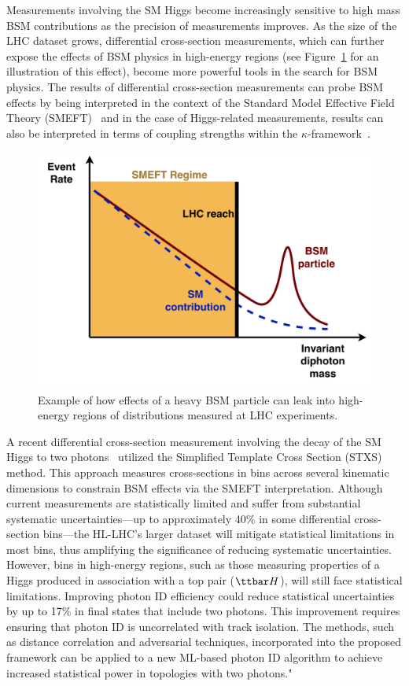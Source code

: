 \documentclass[letter, USenglish, 11pt, subfigure]{article}
\newcommand{\tth}{\ensuremath{\ttbar H}}
\begin{document}
Measurements involving the SM Higgs become increasingly sensitive to high mass BSM contributions as the precision of measurements improves. As the size of the LHC dataset grows, differential cross-section measurements, which can further expose the effects of BSM physics in high-energy regions (see Figure~\ref{fig:SMEFT_highmass} for an illustration of this effect), become more powerful tools in the search for BSM physics.
The results of differential cross-section measurements can probe BSM effects by being interpreted in the context of the Standard Model Effective Field Theory (SMEFT)~\cite{Buchmuller:1985jz,Grzadkowski:2010es,SMEFTsim3} and in the case of Higgs-related measurements, results can also be interpreted in terms of coupling strengths within the $\kappa$-framework~\cite{deFlorian:2016spz}.
\begin{figure}
  \centering
  \includegraphics[width=\linewidth]{figures/SMEFT.pdf}
  \caption{\label{fig:SMEFT_highmass} Example of how effects of a heavy BSM particle can leak into high-energy regions of distributions measured at LHC experiments.}
\end{figure}
A recent differential cross-section measurement involving the decay of the SM Higgs to two photons~\cite{ATLAS_STXS} utilized the Simplified Template Cross Section (STXS) method. This approach measures cross-sections in bins across several kinematic dimensions to constrain BSM effects via the SMEFT interpretation. Although current measurements are statistically limited and suffer from substantial systematic uncertainties—up to approximately 40\% in some differential cross-section bins—the HL-LHC's larger dataset will mitigate statistical limitations in most bins, thus amplifying the significance of reducing systematic uncertainties. However, bins in high-energy regions, such as those measuring properties of a Higgs produced in association with a top pair (\tth), will still face statistical limitations. Improving photon ID efficiency could reduce statistical uncertainties by up to 17\% in final states that include two photons. This improvement requires ensuring that photon ID is uncorrelated with track isolation. The methods, such as distance correlation and adversarial techniques, incorporated into the proposed framework can be applied to a new ML-based photon ID algorithm to achieve increased statistical power in topologies with two photons."
\end{document}
